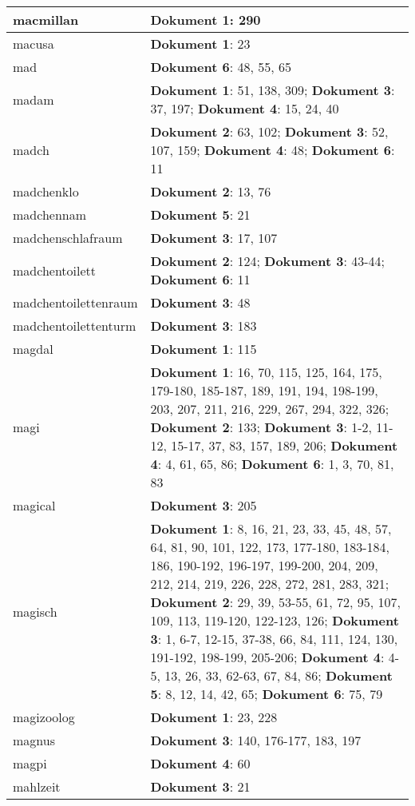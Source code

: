\documentclass[a5paper]{article}
\begin{document}
\begin{longtable}[l]{|l|p{3in}|}
\hline
macmillan & \textbf{Dokument 1}: 290 \\
\hline
macusa & \textbf{Dokument 1}: 23 \\
\hline
mad & \textbf{Dokument 6}: 48, 55, 65 \\
\hline
madam & \textbf{Dokument 1}: 51, 138, 309; \textbf{Dokument 3}: 37, 197; \textbf{Dokument 4}: 15, 24, 40 \\
\hline
madch & \textbf{Dokument 2}: 63, 102; \textbf{Dokument 3}: 52, 107, 159; \textbf{Dokument 4}: 48; \textbf{Dokument 6}: 11 \\
\hline
madchenklo & \textbf{Dokument 2}: 13, 76 \\
\hline
madchennam & \textbf{Dokument 5}: 21 \\
\hline
madchenschlafraum & \textbf{Dokument 3}: 17, 107 \\
\hline
madchentoilett & \textbf{Dokument 2}: 124; \textbf{Dokument 3}: 43-44; \textbf{Dokument 6}: 11 \\
\hline
madchentoilettenraum & \textbf{Dokument 3}: 48 \\
\hline
madchentoilettenturm & \textbf{Dokument 3}: 183 \\
\hline
magdal & \textbf{Dokument 1}: 115 \\
\hline
magi & \textbf{Dokument 1}: 16, 70, 115, 125, 164, 175, 179-180, 185-187, 189, 191, 194, 198-199, 203, 207, 211, 216, 229, 267, 294, 322, 326; \textbf{Dokument 2}: 133; \textbf{Dokument 3}: 1-2, 11-12, 15-17, 37, 83, 157, 189, 206; \textbf{Dokument 4}: 4, 61, 65, 86; \textbf{Dokument 6}: 1, 3, 70, 81, 83 \\
\hline
magical & \textbf{Dokument 3}: 205 \\
\hline
magisch & \textbf{Dokument 1}: 8, 16, 21, 23, 33, 45, 48, 57, 64, 81, 90, 101, 122, 173, 177-180, 183-184, 186, 190-192, 196-197, 199-200, 204, 209, 212, 214, 219, 226, 228, 272, 281, 283, 321; \textbf{Dokument 2}: 29, 39, 53-55, 61, 72, 95, 107, 109, 113, 119-120, 122-123, 126; \textbf{Dokument 3}: 1, 6-7, 12-15, 37-38, 66, 84, 111, 124, 130, 191-192, 198-199, 205-206; \textbf{Dokument 4}: 4-5, 13, 26, 33, 62-63, 67, 84, 86; \textbf{Dokument 5}: 8, 12, 14, 42, 65; \textbf{Dokument 6}: 75, 79 \\
\hline
magizoolog & \textbf{Dokument 1}: 23, 228 \\
\hline
magnus & \textbf{Dokument 3}: 140, 176-177, 183, 197 \\
\hline
magpi & \textbf{Dokument 4}: 60 \\
\hline
mahlzeit & \textbf{Dokument 3}: 21 \\

\end{longtable}
\end{document}
